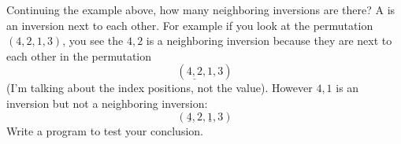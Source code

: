   Continuing the example above,
  how many neighboring inversions
  are there?
  A  is an inversion
  next to each other.
  For example if you look at the permutation $(4,2,1,3)$,
  you see the $4,2$
  is a neighboring inversion because they
  are next to each other in the permutation
  \[
    (\underline{4,2},1,3)
  \]
  (I'm talking about the index
  positions, not the value).
  However $4,1$ is an inversion but not
  a neighboring inversion:
  \[
    (\underline{4},2,\underline{1},3)
  \]
  Write a program to test your
  conclusion.
